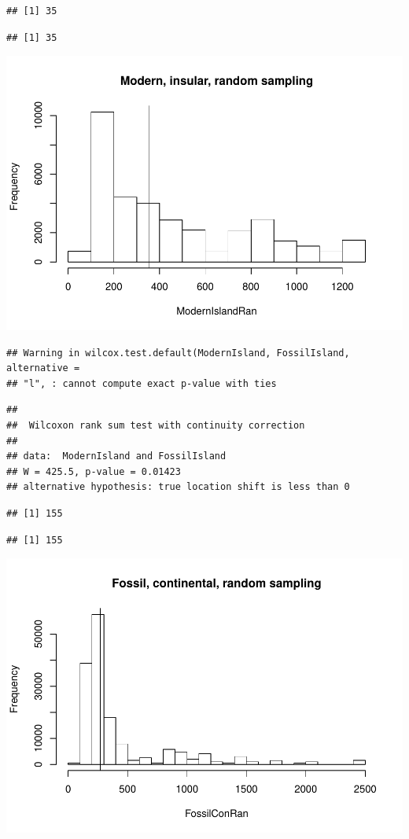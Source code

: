 \documentclass[]{article}
\begin{document}
\begin{verbatim}
## [1] 35
\end{verbatim}

\begin{verbatim}
## [1] 35
\end{verbatim}

\includegraphics{MA_JJ_files/figure-latex/randon sampling modern fossil, island continental-1.pdf}

\begin{verbatim}
## Warning in wilcox.test.default(ModernIsland, FossilIsland, alternative =
## "l", : cannot compute exact p-value with ties
\end{verbatim}

\begin{verbatim}
## 
##  Wilcoxon rank sum test with continuity correction
## 
## data:  ModernIsland and FossilIsland
## W = 425.5, p-value = 0.01423
## alternative hypothesis: true location shift is less than 0
\end{verbatim}

\begin{verbatim}
## [1] 155
\end{verbatim}

\begin{verbatim}
## [1] 155
\end{verbatim}

\includegraphics{MA_JJ_files/figure-latex/randon sampling modern fossil, island continental-2.pdf}
\end{document}
